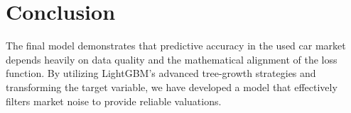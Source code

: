 \documentclass[11pt]{article}
\begin{document}
\section{Conclusion}
The final model demonstrates that predictive accuracy in the used car market depends heavily on data quality and the mathematical alignment of the loss function. By utilizing LightGBM's advanced tree-growth strategies and transforming the target variable, we have developed a model that effectively filters market noise to provide reliable valuations.
\end{document}
